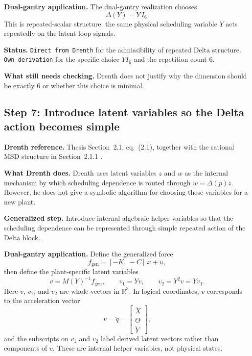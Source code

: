 ﻿\documentclass[11pt]{article}
\newcommand{\R}{\mathbb{R}}
\newcommand{\audititem}[2]{\par\smallskip\noindent\textbf{#1.} #2\par}
\newcommand{\statusline}[1]{\texttt{#1}}
\begin{document}
\audititem{Dual-gantry application}{The dual-gantry realization chooses
\begin{equation}
    \Delta(Y) = Y\,I_6.
    \label{eqv:Delta}
\end{equation}
This is repeated-scalar structure: the same physical scheduling variable $Y$
acts repeatedly on the latent loop signals.}

\audititem{Status}{\statusline{Direct from Drenth} for the admissibility of
repeated Delta structure. \statusline{Own derivation} for the specific choice
$YI_6$ and the repetition count $6$.}

\audititem{What still needs checking}{Drenth does not justify why the dimension
should be exactly $6$ or whether this choice is minimal.}

\subsection{Step 7: Introduce latent variables so the Delta action becomes simple}

\audititem{Drenth reference}{Thesis Section~2.1, eq.~(2.1), together with the
rational MSD structure in Section~2.1.1 \cite{drenth2025thesis}.}

\audititem{What Drenth does}{Drenth uses latent variables $z$ and $w$ as the
internal mechanism by which scheduling dependence is routed through
$w = \Delta(p)z$. However, he does not give a symbolic algorithm for choosing
these variables for a new plant.}

\audititem{Generalized step}{Introduce internal algebraic helper variables so
that the scheduling dependence can be represented through simple repeated action
of the Delta block.}

\audititem{Dual-gantry application}{Define the generalized force
\begin{equation}
    f_{\mathrm{gen}} = [-K,\,-C]\,x + u,
    \label{eqv:fgen}
\end{equation}
then define the plant-specific latent variables
\begin{equation}
    v = M(Y)^{-1} f_{\mathrm{gen}}, \qquad
    v_1 = Yv, \qquad
    v_2 = Y^2 v = Y v_1.
    \label{eqv:latent}
\end{equation}
Here $v$, $v_1$, and $v_2$ are whole vectors in $\R^3$. In logical coordinates,
$v$ corresponds to the acceleration vector
\[
v = \ddot q = \begin{bmatrix} \ddot X \\ \ddot \Theta \\ \ddot Y \end{bmatrix},
\]
and the subscripts on $v_1$ and $v_2$ label derived latent vectors rather than
components of $v$. These are internal helper variables, not physical states.}
\end{document}
